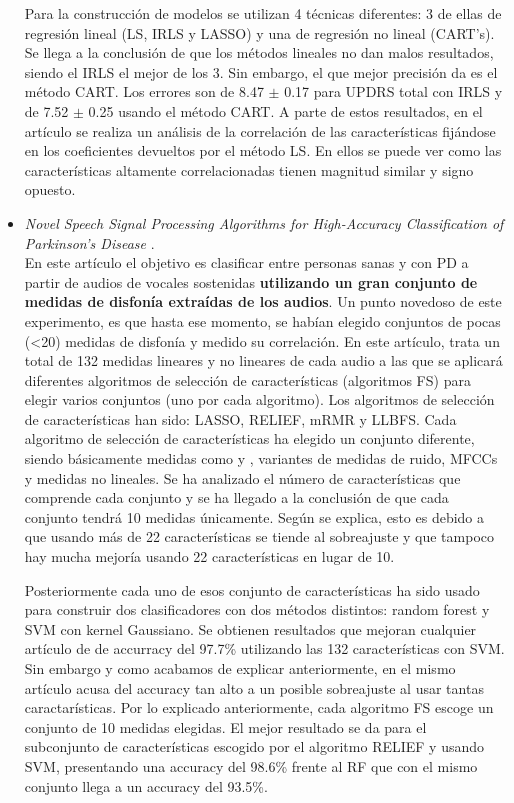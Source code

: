 \begin{itemize}
	 Para la construcción de modelos se utilizan 4 técnicas diferentes: 3 de ellas de regresión lineal (LS, IRLS y LASSO) y una de regresión no lineal (CART's). Se llega a la conclusión de que los métodos lineales no dan malos resultados, siendo el IRLS el mejor de los 3. Sin embargo, el que mejor precisión da es el método CART. Los errores son de 8.47 $\pm$ 0.17 para UPDRS total con IRLS y de 7.52 $\pm$ 0.25 usando el método CART. A parte de estos resultados, en el artículo se realiza un análisis de la correlación de las características fijándose en los coeficientes devueltos por el método LS. En ellos se puede ver como las características altamente correlacionadas tienen magnitud similar y signo opuesto. 
	
	\item \textit{Novel Speech Signal Processing Algorithms for High-Accuracy Classification of Parkinson's Disease} \cite{MxLtNovel}.\\
	En este artículo el objetivo es clasificar entre personas sanas y con PD a partir de audios de vocales sostenidas \textbf{utilizando un gran conjunto de medidas de disfonía extraídas de los audios}. Un punto novedoso de este experimento, es que hasta ese momento, se habían elegido conjuntos de pocas (<20) medidas de disfonía y medido su correlación. En este artículo, trata un total de 132 medidas lineares y no lineares de cada audio a las que se aplicará diferentes algoritmos de selección de características (algoritmos FS) para elegir varios conjuntos (uno por cada algoritmo). Los algoritmos de selección de características han sido: LASSO, RELIEF, mRMR y LLBFS. Cada algoritmo de selección de características ha elegido un conjunto diferente, siendo básicamente medidas como  y , variantes de medidas de ruido, MFCCs y medidas no lineales. Se ha analizado el número de características que comprende cada conjunto y se ha llegado a la conclusión de que cada conjunto tendrá 10 medidas únicamente. Según se explica, esto es debido a que usando más de 22 características se tiende al sobreajuste y que tampoco hay mucha mejoría usando 22 características en lugar de 10.
	
	Posteriormente cada uno de esos conjunto de características ha sido usado para construir dos clasificadores con dos métodos distintos: random forest y SVM con kernel Gaussiano. Se obtienen resultados que mejoran cualquier artículo de de accurracy del 97.7\% utilizando las 132 características con SVM. Sin embargo y como acabamos de explicar anteriormente, en el mismo artículo acusa del accuracy tan alto a un posible sobreajuste al usar tantas caractarísticas. Por lo explicado anteriormente, cada algoritmo FS escoge un conjunto de 10 medidas elegidas. El mejor resultado se da para el subconjunto de características escogido por el algoritmo RELIEF y usando SVM, presentando una accuracy del 98.6\% frente al RF que con el mismo conjunto llega a un accuracy del 93.5\%. 
	

\end{itemize}
